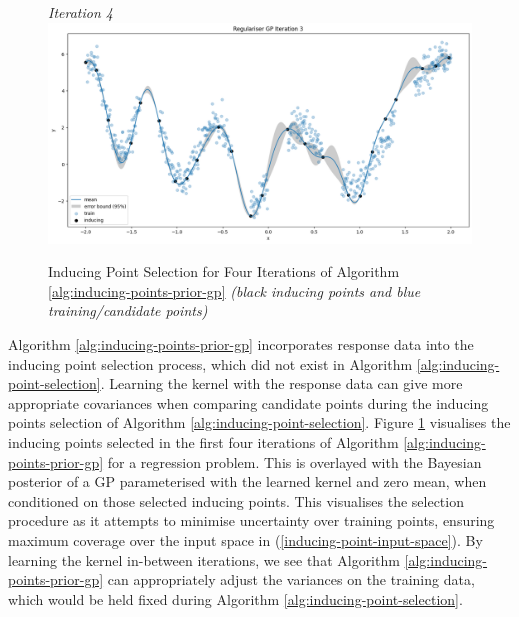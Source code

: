 \documentclass{article}
\numberwithin{equation}{section}
\begin{document}
\begin{figure}[h!]
\begin{minipage}{.5\textwidth}
  \textit{Iteration 4}
  \includegraphics[width=\linewidth, trim={0 0 0 0.77cm},clip]{thesis-report/figures/inducing_points_kernel/iteration-3/prediction.png}
\end{minipage}%
\caption{
Inducing Point Selection for Four Iterations of Algorithm \ref{alg:inducing-points-prior-gp} \textit{(black inducing points and blue training/candidate points)}
}
\label{inducing-points-and-kernel}
\end{figure}

Algorithm \ref{alg:inducing-points-prior-gp} incorporates response data into the inducing point selection process, which did not exist in Algorithm \ref{alg:inducing-point-selection}. 
Learning the kernel with the response data can give more appropriate covariances when comparing candidate points during the inducing points selection of Algorithm \ref{alg:inducing-point-selection}. 
Figure \ref{inducing-points-and-kernel} visualises the inducing points selected in the first four iterations of Algorithm \ref{alg:inducing-points-prior-gp} for a regression problem.
This is overlayed with the Bayesian posterior of a GP parameterised with the learned kernel and zero mean, when conditioned on those selected inducing points. 
This visualises the selection procedure as it attempts to minimise uncertainty over training points, ensuring maximum coverage over the input space in (\ref{inducing-point-input-space}).
By learning the kernel in-between iterations, we see that Algorithm \ref{alg:inducing-points-prior-gp} can appropriately adjust the variances on the training data, which would be held fixed during Algorithm \ref{alg:inducing-point-selection}.
\end{document}
